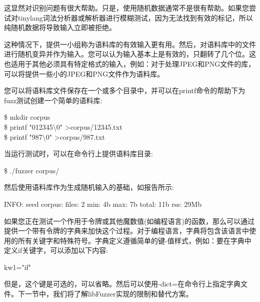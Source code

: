 这显然对识别问题有很大帮助。只是，使用随机数据通常不是很有帮助。如果您尝试对tinylang词法分析器或解析器进行模糊测试，因为无法找到有效的标记，所以纯随机数据将导致输入立即被拒绝。\par

这种情况下，提供一小组称为语料库的有效输入更有用。然后，对语料库中的文件进行随机变异并作为输入。您可以认为输入基本上是有效的，只翻转了几个位。这也适用于其他必须具有特定格式的输入，例如：对于处理JPEG和PNG文件的库，可以将提供一些小的JPEG和PNG文件作为语料库。\par

您可以将语料库文件保存在一个或多个目录中，并可以在printf命令的帮助下为fuzz测试创建一个简单的语料库:\par

\begin{tcolorbox}[colback=white,colframe=black]
\$ mkdir corpus \\
\$ printf "012345$\setminus$0" >corpus/12345.txt \\
\$ printf "987$\setminus$0" >corpus/987.txt
\end{tcolorbox}

当运行测试时，可以在命令行上提供语料库目录:\par

\begin{tcolorbox}[colback=white,colframe=black]
\$ ./fuzzer corpus/
\end{tcolorbox}

然后使用语料库作为生成随机输入的基础，如报告所示:\par

\begin{tcolorbox}[colback=white,colframe=black]
INFO: seed corpus: files: 2 min: 4b max: 7b total: 11b rss: 29Mb
\end{tcolorbox}

如果您正在测试一个作用于令牌或其他魔数值(如编程语言)的函数，那么可以通过提供一个带有令牌的字典来加快这个过程。对于编程语言，字典将包含该语言中使用的所有关键字和特殊符号。字典定义遵循简单的键-值样式，例如：要在字典中定义if关键字，可以添加以下内容:\par

\begin{tcolorbox}[colback=white,colframe=black]
kw1="if"
\end{tcolorbox}

但是，这个键是可选的，可以省略。然后可以使用-dict=在命令行上指定字典文件。下一节中，我们将了解libFuzzer实现的限制和替代方案。\par

